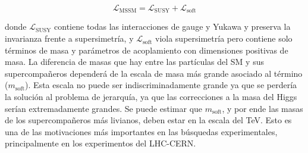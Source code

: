 \begin{equation}
	\mathcal{L}_{\text{MSSM}} = \mathcal{L}_{\text{SUSY}} + \mathcal{L}_{\text{soft}} 
	\label{eq:l_susy}
\end{equation}

donde $\mathcal{L}_{\text{SUSY}}$ contiene todas las interacciones de gauge y Yukawa y preserva la invarianza frente a supersimetría, y $\mathcal{L}_{\text{soft}}$ viola supersimetría pero contiene solo términos de masa y parámetros de acoplamiento con dimensiones positivas de masa. La diferencia de masas que hay entre las partículas del SM y sus supercompañeros dependerá de la escala de masa más grande asociado al término  ($m_{\text{soft}}$). Esta escala no puede ser indiscriminadamente grande ya que se perdería la solución al problema de jerarquía, ya que las correcciones a la masa del Higgs serían extremadamente grandes. Se puede estimar que $m_{\text{soft}}$, y por ende las masas de los supercompañeros más livianos, deben estar en la escala del TeV. Esto es una de las motivaciones más importantes en las búsquedas experimentales, principalmente en los experimentos del LHC-CERN.



